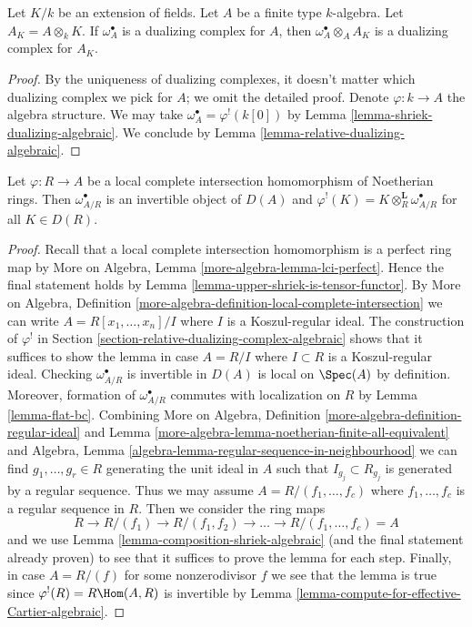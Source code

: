\begin{lemma}
\label{lemma-base-change-dualizing-over-field}
Let $K/k$ be an extension of fields. Let $A$ be a finite type
$k$-algebra. Let $A_K = A \otimes_k K$. If
$\omega_A^\bullet$ is a dualizing complex for $A$, then
$\omega_A^\bullet \otimes_A A_K$ is a dualizing complex for $A_K$.
\end{lemma}

\begin{proof}
By the uniqueness of dualizing complexes, it doesn't matter which
dualizing complex we pick for $A$; we omit the detailed proof.
Denote $\varphi : k \to A$ the algebra structure.
We may take $\omega_A^\bullet = \varphi^!(k[0])$ by
Lemma \ref{lemma-shriek-dualizing-algebraic}.
We conclude by
Lemma \ref{lemma-relative-dualizing-algebraic}.
\end{proof}

\begin{lemma}
\label{lemma-lci-shriek}
Let $\varphi : R \to A$ be a local complete intersection homomorphism of
Noetherian rings. Then $\omega_{A/R}^\bullet$ is an invertible object of
$D(A)$ and $\varphi^!(K) = K \otimes_R^\mathbf{L} \omega_{A/R}^\bullet$
for all $K \in D(R)$.
\end{lemma}

\begin{proof}
Recall that a local complete intersection homomorphism is a perfect
ring map by More on Algebra, Lemma \ref{more-algebra-lemma-lci-perfect}.
Hence the final statement holds by
Lemma \ref{lemma-upper-shriek-is-tensor-functor}.
By More on Algebra, Definition
\ref{more-algebra-definition-local-complete-intersection}
we can write $A = R[x_1, \ldots, x_n]/I$ where $I$ is a
Koszul-regular ideal.
The construction of $\varphi^!$ in
Section \ref{section-relative-dualizing-complex-algebraic}
shows that it suffices to show the lemma in case
$A = R/I$ where $I \subset R$ is a Koszul-regular ideal.
Checking $\omega_{A/R}^\bullet$ is invertible in $D(A)$
is local on $\Spec(A)$ by definition.
Moreover, formation of $\omega_{A/R}^\bullet$ commutes with
localization on $R$ by Lemma \ref{lemma-flat-bc}.
Combining
More on Algebra, Definition \ref{more-algebra-definition-regular-ideal} and
Lemma \ref{more-algebra-lemma-noetherian-finite-all-equivalent} and
Algebra, Lemma \ref{algebra-lemma-regular-sequence-in-neighbourhood}
we can find $g_1, \ldots, g_r \in R$ generating the unit ideal in $A$
such that $I_{g_j} \subset R_{g_j}$ is generated by a regular sequence.
Thus we may assume $A = R/(f_1, \ldots, f_c)$ where $f_1, \ldots, f_c$
is a regular sequence in $R$. Then we consider the ring maps
$$
R \to R/(f_1) \to R/(f_1, f_2) \to \ldots \to R/(f_1, \ldots, f_c) = A
$$
and we use Lemma \ref{lemma-composition-shriek-algebraic}
(and the final statement already proven)
to see that it suffices to prove the lemma for each step.
Finally, in case $A = R/(f)$ for some nonzerodivisor $f$
we see that the lemma is true since $\varphi^!(R) = R\Hom(A, R)$
is invertible by Lemma \ref{lemma-compute-for-effective-Cartier-algebraic}.
\end{proof}

